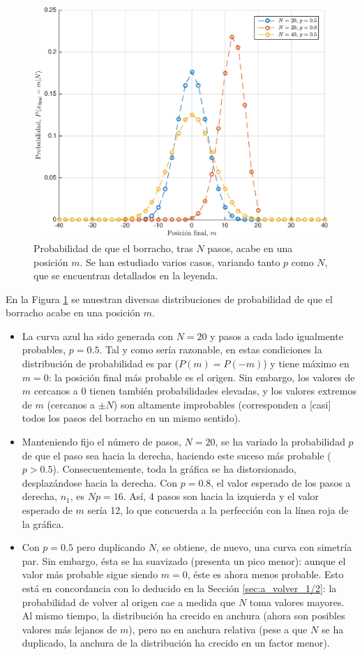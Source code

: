 \begin{figure}[h!]
	\centering
	\includegraphics[width = 0.8\linewidth]{prob_posfinal}
	\vspace{-0.5cm}
	\caption{\small Probabilidad de que el borracho, tras $N$ pasos, acabe en una posición $m$. Se han estudiado varios casos, variando tanto $p$ como $N$, que se encuentran detallados en la leyenda.}
	\label{fig:prob_posfinal}
\end{figure}

En la Figura \ref{fig:prob_posfinal} se muestran diversas distribuciones de probabilidad de que el borracho acabe en una posición $m$.

\begin{itemize}
	\item La curva azul ha sido generada con $N = 20$ y pasos a cada lado igualmente probables, $p=0.5$. Tal y como sería razonable, en estas condiciones la distribución de probabilidad es par ($P(m) =P(-m)$) y tiene máximo en $m=0$: la posición final más probable es el origen. Sin embargo, los valores de $m$ cercanos a 0 tienen también probabilidades elevadas, y los valores extremos de $m$ (cercanos a $\pm N$) son altamente improbables (corresponden a [casi] todos los pasos del borracho en un mismo sentido).
	\item Manteniendo fijo el número de pasos, $N=20$, se ha variado la probabilidad $p$ de que el paso sea hacia la derecha, haciendo este suceso más probable ($p>0.5$). Consecuentemente, toda la gráfica se ha distorsionado, desplazándose hacia la derecha. Con $p=0.8$, el valor esperado de los pasos a derecha, $n_1$, es $Np = 16$. Así, 4 pasos son hacia la izquierda y el valor esperado de $m$ sería 12, lo que concuerda a la perfección con la línea roja de la gráfica.
	\item Con $p=0.5$ pero duplicando $N$, se obtiene, de nuevo, una curva con simetría par. Sin embargo, ésta se ha suavizado (presenta un pico menor): aunque el valor más probable sigue siendo $m=0$, éste es ahora menos probable. Esto está en concordancia con lo deducido en la Sección \ref{sec:a_volver_1/2}: la probabilidad de volver al origen cae a medida que $N$ toma valores mayores. Al mismo tiempo, la distribución ha crecido en anchura (ahora son posibles valores más lejanos de $m$), pero no en anchura relativa (pese a que $N$ se ha duplicado, la anchura de la distribución ha crecido en un factor menor).
\end{itemize}

